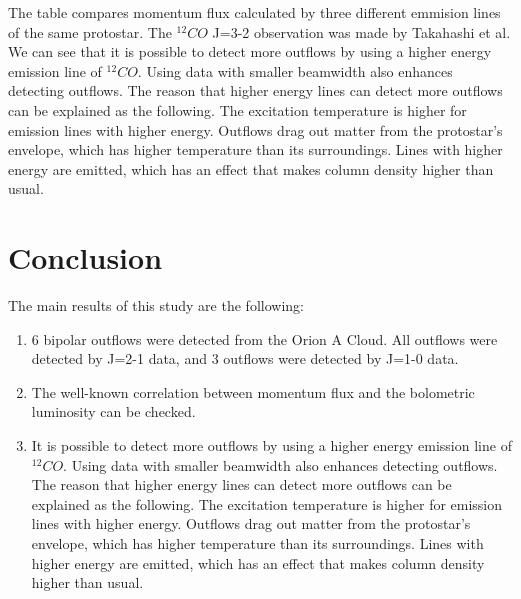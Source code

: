 \documentclass[twoside,11pt]{gshs_thesis}
\begin{document}
The table compares momentum flux calculated by three different emmision lines of the same protostar. The $^{12}CO$ J=3-2 observation was made by Takahashi et al. \cite{Takahashi} We can see that it is possible to detect more outflows by using a higher energy emission line of $^{12}CO$. Using data with smaller beamwidth also enhances detecting outflows. The reason that higher energy lines can detect more outflows can be explained as the following. The excitation temperature is higher for emission lines with higher energy. Outflows drag out matter from the protostar's envelope, which has higher temperature than its surroundings. Lines with higher energy are emitted, which has an effect that makes column density higher than usual.

\newpage

\section{Conclusion}
The main results of this study are the following:
\begin{enumerate}
	\item 6 bipolar outflows were detected from the Orion A Cloud. All outflows were detected by J=2-1 data, and 3 outflows were detected by J=1-0 data.\\
	
	\item The well-known correlation between momentum flux and the bolometric luminosity can be checked. \\
	
	\item It is possible to detect more outflows by using a higher energy emission line of $^{12}CO$. Using data with smaller beamwidth also enhances detecting outflows. The reason that higher energy lines can detect more outflows can be explained as the following. The excitation temperature is higher for emission lines with higher energy. Outflows drag out matter from the protostar's envelope, which has higher temperature than its surroundings. Lines with higher energy are emitted, which has an effect that makes column density higher than usual.\\
	
\end{enumerate}
\end{document}
